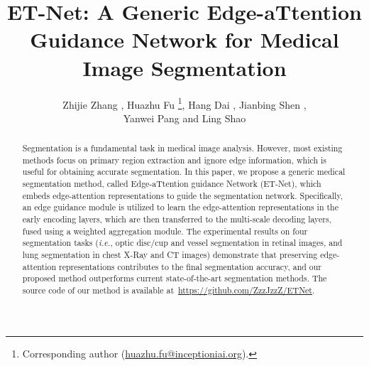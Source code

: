 \documentclass[runningheads,a4paper]{llncs}
\newcommand{\ie}{{\it i.e.}}
\begin{document}
\mainmatter  

\title{ET-Net: A Generic Edge-aTtention Guidance Network for Medical Image Segmentation}





\author{Zhijie Zhang , Huazhu Fu \thanks{Corresponding author (\url{huazhu.fu@inceptioniai.org}).}, Hang Dai , Jianbing Shen , \\ Yanwei Pang  and Ling Shao }




\maketitle

\begin{abstract}
Segmentation is a fundamental task in medical image analysis. However, most existing methods focus on primary region extraction and ignore edge information, which is useful for obtaining accurate segmentation. In this paper, we propose a generic medical segmentation method, called Edge-aTtention guidance Network (ET-Net), which embeds edge-attention representations to guide the segmentation network. Specifically, an edge guidance module is utilized to learn the edge-attention representations in the early encoding layers, which are then transferred to the multi-scale decoding layers, fused using a weighted aggregation module. The experimental results on four segmentation tasks (\ie, optic disc/cup and vessel segmentation in retinal images, and lung segmentation in chest X-Ray and CT images)  demonstrate that preserving edge-attention representations contributes to the final segmentation accuracy, and our proposed method outperforms current state-of-the-art segmentation methods. The source code of our method is available at~\url{https://github.com/ZzzJzzZ/ETNet}.

\end{abstract}
\end{document}
